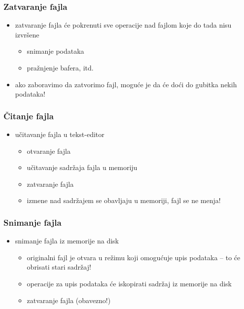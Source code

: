 \documentclass[utf8,compress,aspectratio=169]{beamer}
\begin{document}
\begin{frame}[fragile]
  \frametitle{Zatvaranje fajla}
  \begin{itemize}
    \item zatvaranje fajla će pokrenuti sve operacije nad fajlom koje do tada nisu izvršene
    \begin{itemize}
      \item snimanje podataka
      \item pražnjenje bafera, itd.
    \end{itemize}
    \item ako zaboravimo da zatvorimo fajl, moguće je da će doći do gubitka nekih podataka!
  \end{itemize}
\end{frame}

\begin{frame}[fragile]
  \frametitle{Čitanje fajla}
  \begin{itemize}
    \item učitavanje fajla u tekst-editor
    \begin{itemize}
      \item otvaranje fajla
      \item učitavanje sadržaja fajla u memoriju
      \item zatvaranje fajla
      \item izmene nad sadržajem se obavljaju u memoriji, fajl se ne menja!
    \end{itemize}
  \end{itemize}
\end{frame}

\begin{frame}[fragile]
  \frametitle{Snimanje fajla}
  \begin{itemize}
    \item snimanje fajla iz memorije na disk
    \begin{itemize}
      \item originalni fajl je otvara u režimu koji omogućuje upis podataka -- to će obrisati stari sadržaj!
      \item operacije za upis podataka će iskopirati sadržaj iz memorije na disk
      \item zatvaranje fajla (obavezno!)
    \end{itemize}
  \end{itemize}
\end{frame}
\end{document}

